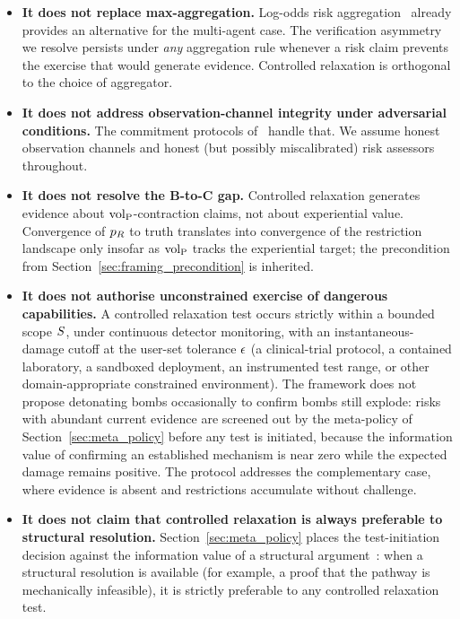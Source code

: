 \begin{itemize}
\item
\textbf{It does not replace max-aggregation.}  Log-odds risk
aggregation~\citep[Definition~5]{lasser2026scm} already provides
an alternative for the multi-agent case.  The verification
asymmetry we resolve persists under \emph{any} aggregation rule
whenever a risk claim prevents the exercise that would generate
evidence.  Controlled relaxation is orthogonal to the choice of
aggregator.

\item
\textbf{It does not address observation-channel integrity under
adversarial conditions.}  The commitment protocols
of~\citep{lasser2026exo} handle that.  We assume honest
observation channels and honest (but possibly miscalibrated) risk
assessors throughout.

\item
\textbf{It does not resolve the B-to-C gap.}  Controlled
relaxation generates evidence about ${\operatorname{vol}_{\mathrm{P}}}$-contraction claims,
not about experiential value.  Convergence of $p_R$ to truth
translates into convergence of the restriction landscape only
insofar as ${\operatorname{vol}_{\mathrm{P}}}$ tracks the experiential target; the
precondition from Section~\ref{sec:framing_precondition} is
inherited.

\item
\textbf{It does not authorise unconstrained exercise of dangerous
capabilities.}  A controlled relaxation test occurs strictly
within a bounded scope $S$, under continuous detector
monitoring, with an instantaneous-damage cutoff at the user-set
tolerance $\epsilon$ (a clinical-trial protocol, a contained
laboratory, a sandboxed deployment, an instrumented test range,
or other domain-appropriate constrained environment).  The
framework does not propose detonating bombs occasionally to
confirm bombs still explode: risks with abundant current evidence
are screened out by the meta-policy of
Section~\ref{sec:meta_policy} before any test is initiated,
because the information value of confirming an established
mechanism is near zero while the expected damage remains positive.
The protocol addresses the complementary case, where evidence is
absent and restrictions accumulate without challenge.

\item
\textbf{It does not claim that controlled relaxation is always
preferable to structural resolution.}
Section~\ref{sec:meta_policy} places the test-initiation decision
against the information value of a structural
argument~\citep[Proposition~2]{lasser2026horizon}: when a
structural resolution is available (for example, a proof that
the pathway is mechanically infeasible), it is strictly
preferable to any controlled relaxation test.


\end{itemize}
